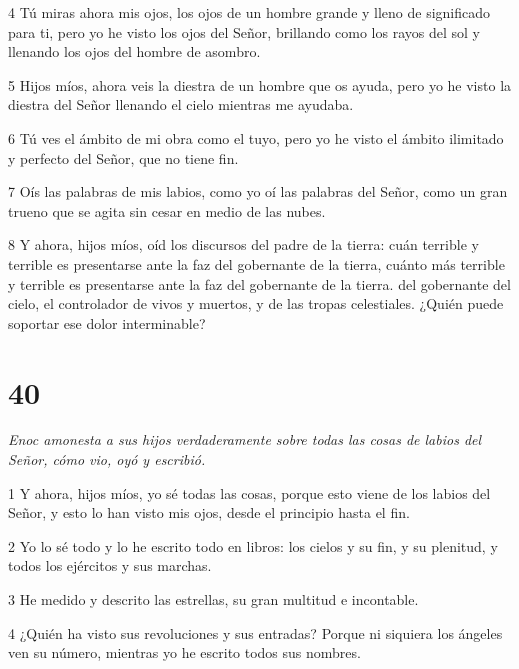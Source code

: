 \par 4 Tú miras ahora mis ojos, los ojos de un hombre grande y lleno de significado para ti, pero yo he visto los ojos del Señor, brillando como los rayos del sol y llenando los ojos del hombre de asombro.

\par 5 Hijos míos, ahora veis la diestra de un hombre que os ayuda, pero yo he visto la diestra del Señor llenando el cielo mientras me ayudaba.

\par 6 Tú ves el ámbito de mi obra como el tuyo, pero yo he visto el ámbito ilimitado y perfecto del Señor, que no tiene fin.

\par 7 Oís las palabras de mis labios, como yo oí las palabras del Señor, como un gran trueno que se agita sin cesar en medio de las nubes.

\par 8 Y ahora, hijos míos, oíd los discursos del padre de la tierra: cuán terrible y terrible es presentarse ante la faz del gobernante de la tierra, cuánto más terrible y terrible es presentarse ante la faz del gobernante de la tierra. del gobernante del cielo, el controlador de vivos y muertos, y de las tropas celestiales. ¿Quién puede soportar ese dolor interminable?

\chapter{40}

\par \textit{Enoc amonesta a sus hijos verdaderamente sobre todas las cosas de labios del Señor, cómo vio, oyó y escribió.}

\par 1 Y ahora, hijos míos, yo sé todas las cosas, porque esto viene de los labios del Señor, y esto lo han visto mis ojos, desde el principio hasta el fin.

\par 2 Yo lo sé todo y lo he escrito todo en libros: los cielos y su fin, y su plenitud, y todos los ejércitos y sus marchas.

\par 3 He medido y descrito las estrellas, su gran multitud e incontable.

\par 4 ¿Quién ha visto sus revoluciones y sus entradas? Porque ni siquiera los ángeles ven su número, mientras yo he escrito todos sus nombres.

